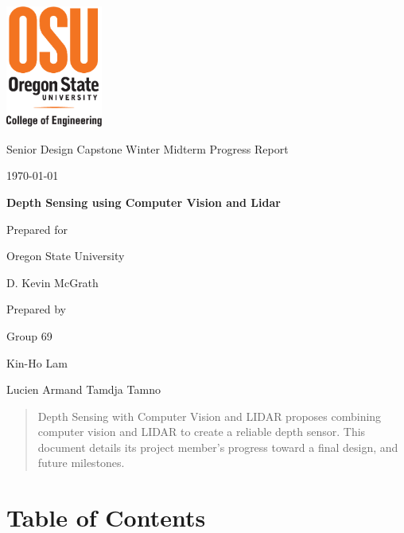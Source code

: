 \documentclass[onecolumn, draftclsnofoot,10pt, compsoc]{IEEEtran}
\def \CapstoneTeamName{			}
\def \CapstoneTeamNumber{		69}
\def \GroupMemberOne{			Kin-Ho Lam}
\def \GroupMemberTwo{			Lucien Armand Tamdja Tamno}
\def \CapstoneProjectName{		Depth Sensing using Computer Vision and Lidar}
\def \CapstoneSponsorCompany{	Oregon State University}
\def \CapstoneSponsorPerson{	D. Kevin McGrath}
\def \DocType{		%
	Winter Midterm Progress Report
}
\newcommand{\NameSigPair}[1]{\par
	\makebox[2.75in][r]{#1} \hfil 	\makebox[3.25in]{\makebox[2.25in]{\hrulefill} \hfill		\makebox[.75in]{\hrulefill}}
	\par\vspace{-12pt} \textit{\tiny\noindent
		\makebox[2.75in]{} \hfil		\makebox[3.25in]{\makebox[2.25in][r]{Signature} \hfill	\makebox[.75in][r]{Date}}}}
\renewcommand{\NameSigPair}[1]{#1}
\begin{document}
	\begin{titlepage}
		\begin{singlespace}
			\centering
			\includegraphics[height=4cm,natwidth=345,natheight=435]{images/osu_logo.png}
			\hfill 
			\par\vspace{.2in}
			\centering
			\scshape{
				\huge Senior Design Capstone \DocType \par
				{\large\today}\par
				\vspace{.5in}
				\textbf{\Huge\CapstoneProjectName}\par
				\vfill
				{\large Prepared for}\par
				\Huge \CapstoneSponsorCompany\par
				\vspace{5pt}
				{\Large\NameSigPair{\CapstoneSponsorPerson}\par}
				{\large Prepared by }\par
				Group\CapstoneTeamNumber\par
				\CapstoneTeamName\par 
				\vspace{5pt}
				{\large
					\NameSigPair{\GroupMemberOne}\par
					\NameSigPair{\GroupMemberTwo}\par
				}
				\vspace{20pt}
			}
			\begin{abstract}  
 				Depth Sensing with Computer Vision and LIDAR proposes combining computer vision and LIDAR to create a reliable depth sensor.
				This document details its project member's progress toward a final design, and future milestones.
			\end{abstract}     
		\end{singlespace}
	\end{titlepage}
\section{Table of Contents}
\tableofcontents


\clearpage
\end{document}
